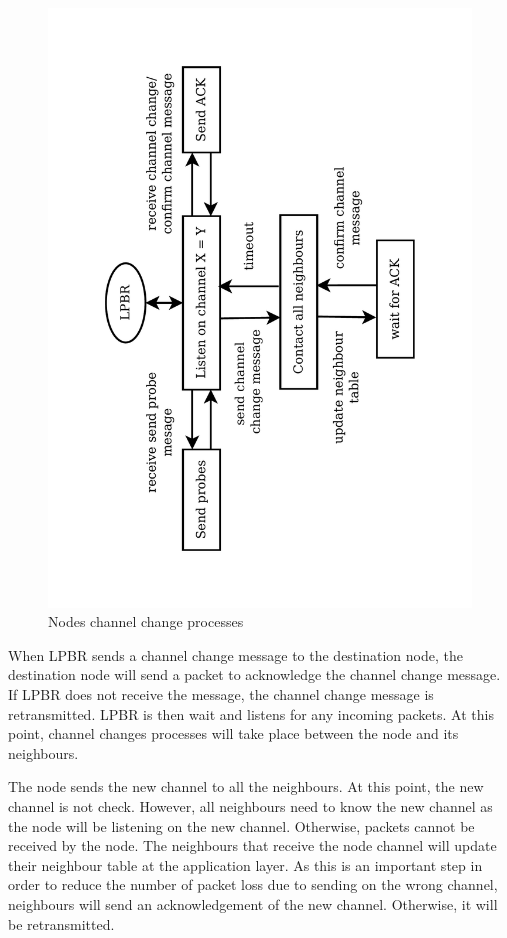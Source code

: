 \begin{figure}
\centering
\includegraphics[trim=2cm 2cm 2.5cm 2cm, clip=true, totalheight=0.58\textheight, angle=270]{otherNodes.pdf}
\caption{Nodes channel change processes}
\label{fig_lpbr}
\end{figure}


When LPBR sends a channel change message to the destination node, the destination node will send a packet to acknowledge the channel change message. If LPBR does not receive the message, the channel change message is retransmitted. LPBR is then wait and listens for any incoming packets. At this point, channel changes processes will take place between the node and its neighbours.

The node sends the new channel to all the neighbours. At this point, the new channel is not check. However, all neighbours need to know the new channel as the node will be listening on the new channel. Otherwise, packets cannot be received by the node. The neighbours that receive the node channel will update their neighbour table at the application layer. As this is an important step in order to reduce the number of packet loss due to sending on the wrong channel, neighbours will send an acknowledgement of the new channel. Otherwise, it will be retransmitted. 

